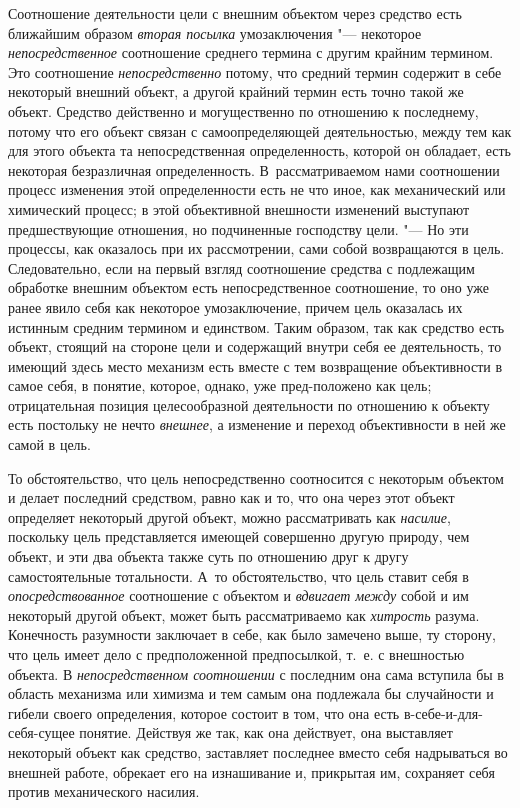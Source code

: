 {{Соотношение деятельности цели с внешним объектом через
средство есть ближайшим образом
{\em вторая посылка}
умозаключения "--- некоторое
{\em непосредственное}
соотношение среднего термина с другим крайним термином. Это
соотношение {\em непосредственно}
потому, что средний термин содержит в себе некоторый внешний
объект, а другой крайний термин есть точно такой же объект. Средство
действенно и могущественно по отношению к последнему, потому что его объект
связан с самоопределяющей деятельностью, между тем как для этого объекта та
непосредственная определенность, которой он обладает, есть некоторая
безразличная определенность. В~рассматриваемом нами соотношении процесс
изменения этой определенности есть не что иное, как механический или
химический процесс; в этой объективной внешности изменений выступают
предшествующие отношения, но подчиненные господству цели. "---
Но эти процессы, как оказалось при их рассмотрении, сами
собой возвращаются в цель. Следовательно, если на первый взгляд соотношение
средства с подлежащим обработке внешним объектом есть непосредственное
соотношение, то оно уже ранее явило себя как некоторое умозаключение,
причем цель оказалась их истинным средним термином и единством. Таким
образом, так как средство есть объект, стоящий на стороне цели и содержащий
внутри себя ее деятельность, то имеющий здесь место механизм есть вместе с
тем возвращение объективности в самое себя, в понятие, которое, однако, уже
пред-положено как цель; отрицательная позиция целесообразной деятельности
по отношению к объекту есть постольку не нечто
{\em внешнее}, а
изменение и переход объективности в ней же самой в цель.

То обстоятельство, что цель непосредственно соотносится с
некоторым объектом и делает последний средством, равно как и то, что она
через этот объект определяет некоторый другой объект, можно рассматривать
как {\em насилие},
поскольку цель представляется имеющей совершенно другую
природу, чем объект, и эти два объекта также суть по отношению друг к другу
самостоятельные тотальности. А~то обстоятельство, что цель ставит себя в
{\em опосредствованное}
соотношение с объектом и
{\em вдвигает между}
собой и им некоторый другой объект, может быть рассматриваемо
как {\em хитрость}
разума. Конечность разумности заключает в себе, как было
замечено выше, ту сторону, что цель имеет дело с
предположенной предпосылкой, т.~е. с внешностью объекта. В
{\em непосредственном соотношении}
с последним она сама вступила бы в область механизма или
химизма и тем самым она подлежала бы случайности и гибели своего
определения, которое состоит в том, что она есть в-себе-и-для-себя-сущее
понятие. Действуя же так, как она действует, она выставляет некоторый
объект как средство, заставляет последнее вместо себя надрываться во
внешней работе, обрекает его на изнашивание и, прикрытая им, сохраняет себя
против механического насилия.

}}
